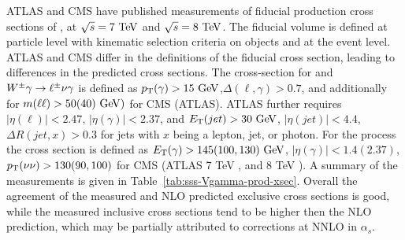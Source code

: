 ATLAS and CMS have published measurements of fiducial production cross sections of
\Wglvg, \Zgllg at $\rts=7\TeV$ and $\rts=8\TeV$. 
The fiducial volume is defined at particle level with kinematic selection criteria 
on objects and at the event level. ATLAS and CMS differ in the definitions 
of the fiducial cross section, leading to differences in the predicted cross sections. 
The cross-section for \Zgllg\; and $W^{\pm}\gamma \rightarrow \ell^\pm \nu \gamma $ is defined as 
$\pt(\gamma)>15\GeV$,$\Delta(\ell,\gamma)>0.7$, and additionally for \Zg\; $m(\ell\ell)>50 (40) \GeV)$ 
for CMS (ATLAS). ATLAS further requires $|\eta(\ell)|<2.47$,  $|\eta(\gamma)|<2.37$, and 
$\ET(jet) >30\GeV$, $|\eta(jet)|<4.4$, $\Delta R (jet,x) > 0.3$ for jets with $x$ being a lepton, jet, or photon. 
For the \Zgvvg\; process the cross section is defined as $\ET(\gamma)>145 (100, 130)\GeV$, 
$|\eta(\gamma)|<1.4(2.37)$, $p_{\mathrm{T}}(\nu\nu)>130(90, 100)$ for CMS (ATLAS 7 TeV \cite{Chatrchyan:2013nda}, and 8 TeV \cite{Aad:2016sau}).
A summary of the measurements is given in Table~\ref{tab:sss-Vgamma-prod-xsec}. Overall the agreement
of the measured and NLO predicted exclusive cross sections is good, while the measured inclusive cross sections tend to be
higher then the NLO prediction, which may be partially attributed to corrections at NNLO in $\alpha_s$.


